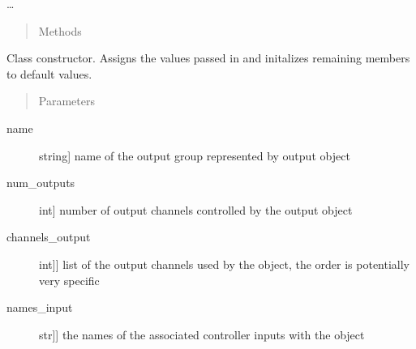 \documentclass[letterpaper,10pt,english]{sphinxmanual}
\begin{document}
\begin{fulllineitems}
\begin{description}
\end{description}

\sphinxAtStartPar
…
\begin{quote}\begin{description}
\item[{Methods}] \leavevmode
\end{description}\end{quote}

\begin{fulllineitems}
\label{\detokenize{base:MultiInputOutputObject.MultiInputOutputObject.__init__}}
\sphinxAtStartPar
Class constructor. Assigns the values passed in and initalizes remaining members to default values.
\begin{quote}\begin{description}
\item[{Parameters}] \leavevmode
\end{description}\end{quote}
\begin{description}
\item[{name}] \leavevmode{[}string{]}
\sphinxAtStartPar
name of the output group represented by output object

\item[{num\_outputs}] \leavevmode{[}int{]}
\sphinxAtStartPar
number of output channels controlled by the output object

\item[{channels\_output}] \leavevmode{[}{[}int{]}{]}
\sphinxAtStartPar
list of the output channels used by the object, the order is potentially very specific

\item[{names\_input}] \leavevmode{[}{[}str{]}{]}
\sphinxAtStartPar
the names of the associated controller inputs with the object

\end{description}

\end{fulllineitems}



\end{fulllineitems}
\end{document}
